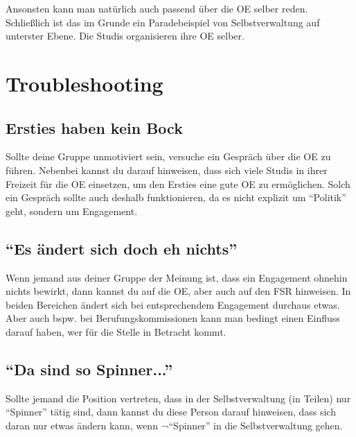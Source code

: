 \documentclass[a4paper,11pt]{scrartcl} %
\begin{document}
Ansonsten kann man natürlich auch passend über die OE selber reden. Schließlich ist das im Grunde
ein Paradebeispiel von Selbstverwaltung auf unterster Ebene. Die Studis organisieren ihre OE selber.

\section{Troubleshooting}

\subsection{Ersties haben kein Bock}

Sollte deine Gruppe unmotiviert sein, versuche ein Gespräch über die OE zu führen. Nebenbei kannst
du darauf hinweisen, dass sich viele Studis in ihrer Freizeit für die OE einsetzen, um den Ersties
eine gute OE zu ermöglichen. Solch ein Gespräch sollte auch deshalb funktionieren, da es nicht explizit
um "`Politik"' geht, sondern um Engagement.

\subsection{"`Es ändert sich doch eh nichts"'}

Wenn jemand aus deiner Gruppe der Meinung ist, dass ein Engagement ohnehin nichts bewirkt, dann kannst
du auf die OE, aber auch auf den FSR hinweisen. In beiden Bereichen ändert sich bei entsprechendem
Engagement durchaus etwas. Aber auch bspw. bei Berufungskommissionen kann man bedingt einen Einfluss darauf
haben, wer für die Stelle in Betracht kommt.

\subsection{"`Da sind so Spinner..."'}

Sollte jemand die Position vertreten, dass in der Selbstverwaltung (in Teilen) nur "`Spinner"' tätig sind,
dann kannst du diese Person darauf hinweisen, dass sich daran nur etwas ändern kann, wenn ¬"`Spinner"'
in die Selbstverwaltung gehen.
\end{document}
